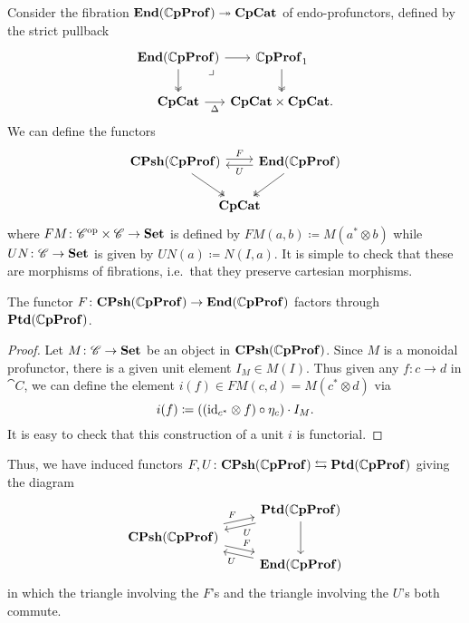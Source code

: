 \documentclass[11pt,oneside,article]{memoir}
\begin{document}
Consider the fibration $\mathbf{End}(\mathbb{C}\mathbf{pProf})\twoheadrightarrow\mathbf{CpCat}$ of endo-profunctors, defined by the strict pullback
\[ \begin{tikzcd}[column sep=0em]
   \End(\dCompProf) \ar[d,two heads] \ar[r] \ar[dr,phantom,"\lrcorner" very near start]
      & \dCompProf_1 \ar[d,two heads] \\
   \CompCat \ar[r,"\Delta"']
      & \CompCat\times\CompCat.
\end{tikzcd} \]
We can define the functors
\begin{equation} \begin{tikzcd}[column sep=-1em]
   \label{eqn:functors_1C_CC}
   \CPsh(\dCompProf) \ar[rr,shift left,"F"] \ar[dr,two heads]
   && \End(\dCompProf) \ar[ll,shift left,"U"] \ar[dl,two heads] \\
   & \CompCat &
\end{tikzcd} \end{equation}
where $FM\colon{\mathscr{C}}^{\text{op}}\times \mathscr{C}\to\mathbf{Set}$ is defined by $FM(a,b)\coloneqq M(a^*\otimes b)$ while $UN\colon \mathscr{C}\to\mathbf{Set}$ is given by $UN(a)\coloneqq N(I,a)$. It is simple to check that these are morphisms of fibrations, i.e.\ that they preserve cartesian morphisms.

\begin{proposition}
      \label{Prop:canonical unit}
   The functor $F\colon\mathbf{CPsh}(\mathbb{C}\mathbf{pProf})\to\mathbf{End}(\mathbb{C}\mathbf{pProf})$ factors through $\mathbf{Ptd}(\mathbb{C}\mathbf{pProf})$.
\end{proposition}
\begin{proof}
   Let $M\colon \mathscr{C}\to\mathbf{Set}$ be an object in $\mathbf{CPsh}(\mathbb{C}\mathbf{pProf})$. Since $M$ is a monoidal profunctor, there is a given unit element $I_M\in M(I)$.  Thus given any $f\colon c\to d$ in $ \cat{C}$, we can define the element $i(f)\in FM(c,d)=M(c^*\otimes d)$ via
   \[i(f)\coloneqq((\mathrm{id}_{c^*}\otimes f)\circ\eta_c)\cdot I_M.\]
   It is easy to check that this construction of a unit $i$ is functorial.
\end{proof}

Thus, we have induced functors $F,U\colon\mathbf{CPsh}(\mathbb{C}\mathbf{pProf})\leftrightarrows\mathbf{Ptd}(\mathbb{C}\mathbf{pProf})$ giving the diagram
\begin{equation} \begin{tikzcd}[row sep=tiny]
      \label{eqn:ptd_functors_1C_CC}
   & \Ptd(\dCompProf) \ar[dd] \ar[dl,shift left,"U"] \\
   \CPsh(\dCompProf) \ar[ur,shift left,"F"] \ar[dr,shift left,"F"] & \\
   & \End(\dCompProf) \ar[ul,shift left,"U"]
\end{tikzcd} \end{equation}
in which the triangle involving the $F$'s and the triangle involving the $U$'s both commute.
\end{document}
